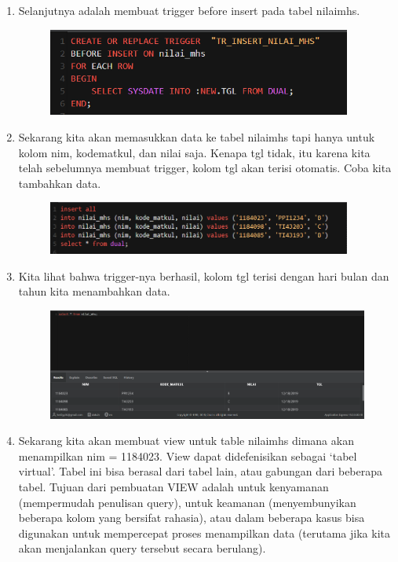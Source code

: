 \documentclass[12pt, times new roman]{article}
\begin{document}
\begin{enumerate}
\begin{figure}[!htbp]
\end{figure}
\item Selanjutnya adalah membuat trigger before insert pada tabel nilaimhs.
\begin{figure}[!htbp]
	\centering
	\includegraphics[width=10cm]{figures/19.png}
\end{figure}
\item Sekarang kita akan memasukkan data ke tabel nilaimhs tapi hanya untuk kolom nim, kodematkul, dan nilai saja. Kenapa tgl tidak, itu karena kita telah sebelumnya membuat trigger, kolom tgl akan terisi otomatis. Coba kita tambahkan data.
\begin{figure}[!htbp]
	\centering
	\includegraphics[width=10cm]{figures/7.png}
\end{figure}
\item Kita lihat bahwa trigger-nya berhasil, kolom tgl terisi dengan hari bulan dan tahun kita menambahkan data.
\begin{figure}[!htbp]
	\centering
	\includegraphics[width=12cm]{figures/21.png}
\end{figure}
\item Sekarang kita akan membuat view untuk table nilaimhs dimana akan menampilkan nim = 1184023. View dapat didefenisikan sebagai ‘tabel virtual’. Tabel ini bisa berasal dari tabel lain, atau gabungan dari beberapa tabel. Tujuan dari pembuatan VIEW adalah untuk kenyamanan (mempermudah penulisan query), untuk keamanan (menyembunyikan beberapa kolom yang bersifat rahasia), atau dalam beberapa kasus bisa digunakan untuk mempercepat proses menampilkan data (terutama jika kita akan menjalankan query tersebut secara berulang).

\end{enumerate}
\end{document}
